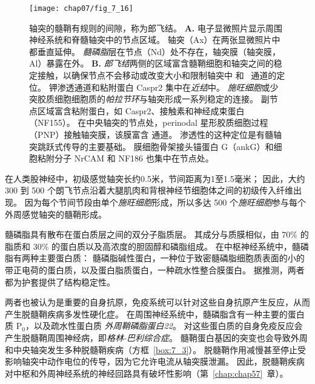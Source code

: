 \begin{figure}[htbp]
	\centering
	\texttt{[image: chap07/fig\_7\_16]}
	\caption{轴突的髓鞘有规则的间隙，称为郎飞结。
		\textbf{A.} 电子显微照片显示周围神经系统和脊髓轴突中的节点区域。
		轴突（Ax）在两张显微照片中都垂直延伸。
		\textit{髓磷脂}层在节点（Nd）处不存在，轴突膜（轴突膜，Al）暴露在外\cite{peters1991neuropil}。
		\textbf{B.} \textit{郎飞结}两侧的区域富含髓鞘细胞和轴突之间的稳定接触，以确保节点不会移动或改变大小和限制轴突中  和~ 通道的定位。
		钾渗透通道和粘附蛋白 Caspr2 集中在\textit{近结}中。
		\textit{施旺细胞}或少突胶质细胞细胞质的\textit{帕拉节环}与轴突形成一系列稳定的连接。
		副节点区域富含粘附蛋白，如 Caspr2、接触素和神经成束蛋白（NF155）。
		在中央轴突的节点处，perinodal 星形胶质细胞过程（PNP）接触轴突膜，该膜富含  通道。
		 渗透性的这种定位是有髓轴突跳跃式传导的主要基础。
		膜细胞骨架接头锚蛋白 G（ankG）和细胞粘附分子 NrCAM 和 NF186 也集中在节点处\cite{peles2000molecular}。}
	\label{fig:7_16}
\end{figure}


在人类股神经中，初级感觉轴突长约0.5米，节间距离为1至1.5毫米；
因此，大约 300 到 500 个朗飞节点沿着大腿肌肉和背根神经节细胞体之间的初级传入纤维出现。
因为每个节间节段由单个\textit{施旺细胞}形成，所以多达 500 个\textit{施旺细胞}参与每个外周感觉轴突的髓鞘形成。


髓磷脂具有散布在蛋白质层之间的双分子脂质层。
其成分与质膜相似，由 70\% 的脂质和 30\% 的蛋白质以及高浓度的胆固醇和磷脂组成。
在中枢神经系统中，髓磷脂有两种主要蛋白质：
髓磷脂碱性蛋白，一种位于致密髓磷脂细胞质表面的小的带正电荷的蛋白质，以及蛋白脂质蛋白，一种疏水性整合膜蛋白。
据推测，两者都为护套提供了结构稳定性。



两者也被认为是重要的自身抗原，免疫系统可以针对这些自身抗原产生反应，从而产生脱髓鞘疾病多发性硬化症。 
在周围神经系统中，髓磷脂含有一种主要的蛋白质 P$_0$，以及疏水性蛋白质 \textit{外周鞘磷脂蛋白22}。
对这些蛋白质的自身免疫反应会产生脱髓鞘周围神经病，即\textit{格林-巴利综合症}。
髓鞘蛋白基因的突变也会导致外周和中央轴突发生多种脱髓鞘疾病（方框~\ref{box:7_3}）。
脱髓鞘作用减慢甚至停止受影响轴突中动作电位的传导，因为它允许电流从轴突膜泄漏。
因此，脱髓鞘疾病对中枢和外周神经系统的神经回路具有破坏性影响（第~\ref{chap:chap57}~章）。


